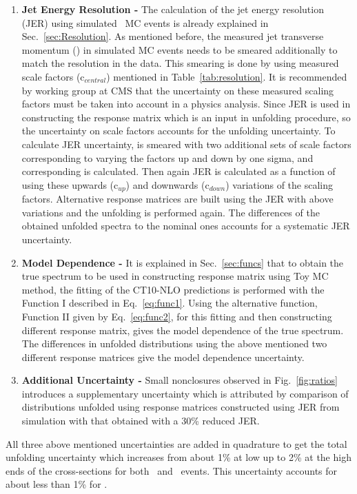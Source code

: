 \begin{enumerate}
\item {\bf Jet Energy Resolution -} The calculation of the jet energy resolution (JER) using simulated \MGP~MC events is already explained in Sec.~\ref{sec:Resolution}. As mentioned before, the measured jet transverse momentum (\ptn) in simulated MC events needs to be smeared additionally to match the resolution in the data. This smearing is done by using measured scale factors (c$_{central}$) mentioned in Table~\ref{tab:resolution}. It is recommended by \JetMet working group at CMS that the uncertainty on these measured scaling factors must be taken into account in a physics analysis. Since JER is used in constructing the response matrix which is an input in unfolding procedure, so the uncertainty on scale factors accounts for the unfolding uncertainty. To calculate JER uncertainty, \pt is smeared with two additional sets of scale factors corresponding to varying the factors up and down by one sigma, and corresponding \httwo is calculated. Then again JER is calculated as a function of \httwo using these upwards (c$_{up}$) and downwards (c$_{down}$) variations of the scaling factors. Alternative response matrices are built using the JER with above variations and the unfolding is performed again. The differences of the obtained unfolded spectra to the nominal ones accounts for a systematic JER uncertainty. 

\item {\bf Model Dependence -} It is explained in Sec.~\ref{sec:funcs} that to obtain the true \httwo spectrum to be used in constructing response matrix using Toy MC method, the fitting of the CT10-NLO predictions is performed with the Function I described in Eq.~\ref{eq:func1}. Using the alternative function, Function II given by Eq.~\ref{eq:func2}, for this fitting and then constructing different response matrix, gives the model dependence of the true \httwo spectrum. The differences in unfolded distributions using the above mentioned two different response matrices give the model dependence uncertainty.

\item {\bf Additional Uncertainty -} Small nonclosures observed in Fig.~\ref{fig:ratios} introduces a supplementary uncertainty which is attributed by comparison of distributions unfolded using response matrices constructed using JER from simulation with that obtained with a 30\% reduced JER. 
\end{enumerate}

All three above mentioned uncertainties are added in quadrature to get the total unfolding uncertainty which increases from about 1\% at low \httwo up to 2\% at the high \httwo ends of the cross-sections for both \njt~and \njth~events. This uncertainty accounts for about less than 1\% for \ratio.

